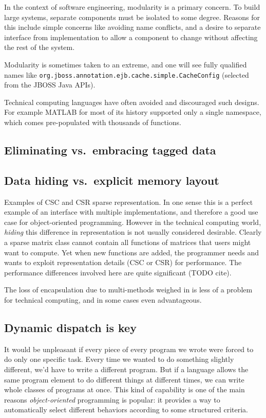 In the context of software engineering, modularity is a primary concern.
To build large systems, separate components must be isolated to some
degree.
Reasons for this include simple concerns like avoiding name conflicts,
and a desire to separate interface from implementation to allow
a component to change without affecting the rest of the system.

Modularity is sometimes taken to an extreme, and one will see
fully qualified names like \texttt{org.jboss.annotation.ejb.cache.simple.CacheConfig}
(selected from the JBOSS Java APIs).

Technical computing languages have often avoided and discouraged such
designs. For example MATLAB for most of its history supported only a single
namespace, which comes pre-populated with thousands of functions.


\subsection{Eliminating vs.\ embracing tagged data}

\subsection{Data hiding vs.\ explicit memory layout}

Examples of CSC and CSR sparse representation.
In one sense this is a perfect example of an interface with multiple implementations,
and therefore a good use case for object-oriented programming.
However in the technical computing world, \emph{hiding} this difference in
representation is not usually considered desirable.
Clearly a sparse matrix class cannot contain all functions of matrices that users
might want to compute.
Yet when new functions are added, the programmer needs and wants to exploit
representation details (CSC or CSR) for performance.
The performance differences involved here are quite significant (TODO cite).

The loss of encapsulation due to multi-methods weighed in \cite{binarymethods}
is less of a problem for technical computing, and in some cases even
advantageous.

\subsection{Dynamic dispatch is key}


It would be unpleasant if every piece of every program we wrote were forced
to do only one specific task. Every time we wanted to do something slightly
different, we'd have to write a different program. But if a language
allows the same program element to do different things at different times,
we can write whole classes of programs at once. This kind of capability is
one of the main reasons \emph{object-oriented} programming is popular: it
provides a way to automatically select different behaviors according to
some structured criteria.

